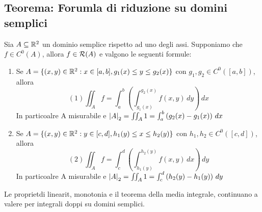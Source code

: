 \subsection{Teorema: Forumla di riduzione su domini semplici}
\begin{theorem}
  \label{14.17}
  Sia $A\subseteq\mathbb{R}^2$ un dominio semplice rispetto ad uno degli assi. Supponiamo che $f\in C^{0}(A)$, allora 
  $f\in\mathcal{R}(A)$ e valgono le seguenti formule:
  \begin{enumerate}
    \item Se $A = \{(x,y)\in\mathbb{R}^2 : x \in [a,b], g_1(x) \leq y \leq g_2(x)\}$ con $g_1, g_2 \in C^0([a,b])$, allora 
          $$(1) \iint_{A} f = \int_{a}^{b} \left(\int_{g_1(x)}^{g_2(x)} f(x,y) \, dy\right) \, dx$$
          In particoalre A \ace misurabile e $\left\lvert A \right\rvert_2 = \iint_{A} 1 = \int_{a}^{b} \left(g_2(x)-g_1(x)\right) \, dx$
    \item Se $A = \{(x,y)\in\mathbb{R}^2 : y \in [c,d], h_1(y) \leq x \leq h_2(y)\}$ con $h_1, h_2 \in C^0([c,d])$, allora 
          $$(2) \iint_{A} f = \int_{c}^{d} \left(\int_{h_1(y)}^{h_2(y)} f(x,y) \, dx\right) \, dy$$
          In particoalre A \ace misurabile e $\left\lvert A \right\rvert_2 = \iint_{A} 1 = \int_{c}^{d} \left(h_2(y)-h_1(y)\right) \, dy$
  \end{enumerate}
\end{theorem}
\begin{osservazione}
  Le propriet\aca di linearit\aca, monotonia e il teorema della media integrale, continuano a valere per integrali
  doppi su domini semplici.
\end{osservazione}
